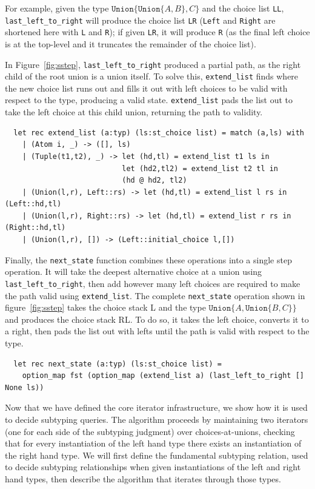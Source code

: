 \documentclass[a4paper,english]{lipics-v2019}
\newcommand{\xt}[1]{\texttt{#1}}
\newcommand{\union}[2]{\xt{Union\{}#1,#2\xt{\}}}
\begin{document}
For example, given the
type $\union{\union{A}{B}}{C}$ and the choice list \verb+LL+,
\verb|last_left_to_right| will produce the choice list \verb+LR+
(\verb+Left+ and \verb+Right+ are shortened here with \verb+L+ and
\verb+R+); if given \verb+LR+, it will produce \verb+R+ (as the final
left choice is at the top-level and it truncates the remainder of the
choice list).

In Figure~\ref{fig:sstep},
\verb|last_left_to_right| produced a partial path, as the right child of the root
union is a union itself. To solve this, \verb|extend_list| finds where the new
choice list runs out and fills it out with left choices to be valid with respect to the type,
producing a valid state. \verb|extend_list| pads the list out to take the left choice
at this child union, returning the path to validity.
\begin{small}
\begin{verbatim}
  let rec extend_list (a:typ) (ls:st_choice list) = match (a,ls) with
    | (Atom i, _) -> ([], ls)
    | (Tuple(t1,t2), _) -> let (hd,tl) = extend_list t1 ls in
                           let (hd2,tl2) = extend_list t2 tl in
                           (hd @ hd2, tl2)
    | (Union(l,r), Left::rs) -> let (hd,tl) = extend_list l rs in (Left::hd,tl)
    | (Union(l,r), Right::rs) -> let (hd,tl) = extend_list r rs in (Right::hd,tl)
    | (Union(l,r), []) -> (Left::initial_choice l,[])
\end{verbatim}
\end{small}


Finally, the \verb|next_state| function combines these operations into
a single step operation. It will take the deepest alternative choice
at a union using \verb|last_left_to_right|, then add however many left
choices are required to make the path valid using \verb|extend_list|. The
complete \verb|next_state| operation shown in figure~\ref{fig:sstep} takes
the choice stack L and the type $\union{A}{\union{B}{C}}$ and produces the
choice stack RL. To do so, it takes the left choice, converts it to a right,
then pads the list out with lefts until the path is valid with respect to the 
type.
\begin{small}
\begin{verbatim}
  let rec next_state (a:typ) (ls:st_choice list) =
    option_map fst (option_map (extend_list a) (last_left_to_right [] None ls))
\end{verbatim}
\end{small}


Now that we have defined the core iterator infrastructure, we show how it
is used to decide subtyping queries. The algorithm proceeds by maintaining two
iterators (one for each side of the subtyping judgment) over choices-at-unions,  
checking that for every instantiation of the left hand type there
exists an instantiation of the right hand type. We will first define the
fundamental subtyping relation, used to decide subtyping relationships when
given instantiations of the left and right hand types, then describe the
algorithm that iterates through those types.
\end{document}
